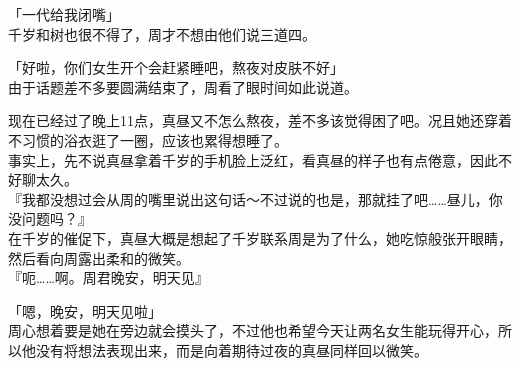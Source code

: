 「一代给我闭嘴」\\

千岁和树也很不得了，周才不想由他们说三道四。

「好啦，你们女生开个会赶紧睡吧，熬夜对皮肤不好」\\

由于话题差不多要圆满结束了，周看了眼时间如此说道。

现在已经过了晚上11点，真昼又不怎么熬夜，差不多该觉得困了吧。况且她还穿着不习惯的浴衣逛了一圈，应该也累得想睡了。\\

事实上，先不说真昼拿着千岁的手机脸上泛红，看真昼的样子也有点倦意，因此不好聊太久。\\

『我都没想过会从周的嘴里说出这句话～不过说的也是，那就挂了吧……昼儿，你没问题吗？』\\

在千岁的催促下，真昼大概是想起了千岁联系周是为了什么，她吃惊般张开眼睛，然后看向周露出柔和的微笑。\\

『呃……啊。周君晚安，明天见』

「嗯，晚安，明天见啦」\\

周心想着要是她在旁边就会摸头了，不过他也希望今天让两名女生能玩得开心，所以他没有将想法表现出来，而是向着期待过夜的真昼同样回以微笑。

